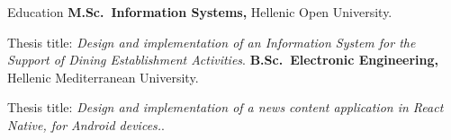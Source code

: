 \begin{rubric}{Education}
\entry*[2022 -- present]%
	\textbf{M.Sc.~Information Systems,} Hellenic Open University.
	\par Thesis title: \emph{Design and implementation of an Information System for the Support of Dining Establishment Activities}.
%
\entry*[2015 -- 2021]%
	\textbf{B.Sc.~Electronic Engineering,} Hellenic Mediterranean University.\par
	Thesis title: \emph{Design and implementation of a news content application in React
	Native, for Android devices.}.
\end{rubric}